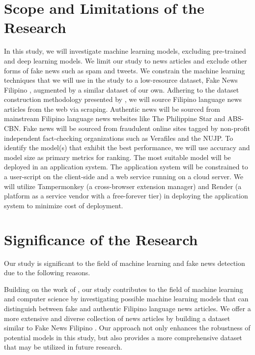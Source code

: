 \section{Scope and Limitations of the Research}
\label{sec:scopelimitations}

In this study, we will investigate machine learning models, excluding pre-trained and deep learning models. We limit our study to news articles and exclude other forms of fake news such as spam and tweets. We constrain the machine learning techniques that we will use in the study to a low-resource dataset, Fake News Filipino \cite{fake-news-filipino}, augmented by a similar dataset of our own. Adhering to the dataset construction methodology presented by , we will source Filipino language news articles from the web via scraping. Authentic news will be sourced from mainstream Filipino language news websites like The Philippine Star and ABS-CBN. Fake news will be sourced from fraudulent online sites tagged by non-profit independent fact-checking organizations such as Verafiles and the NUJP. To identify the model(s) that exhibit the best performance, we will use accuracy and model size as primary metrics for ranking. The most suitable model will be deployed in an application system. The application system will be constrained to a user-script on the client-side and a web service running on a cloud server. We will utilize Tampermonkey (a cross-browser extension manager) and Render (a platform as a service vendor with a free-forever tier) in deploying the application system to minimize cost of deployment.

\section{Significance of the Research}
\label{sec:significance}

Our study is significant to the field of machine learning and fake news detection due to the following reasons.

Building on the work of , our study contributes to the field of machine learning and computer science by investigating possible machine learning models that can distinguish between fake and authentic Filipino language news articles. We offer a more extensive and diverse collection of news articles by building a dataset similar to Fake News Filipino \cite{fake-news-filipino}. Our approach not only enhances the robustness of potential models in this study, but also provides a more comprehensive dataset that may be utilized in future research.

